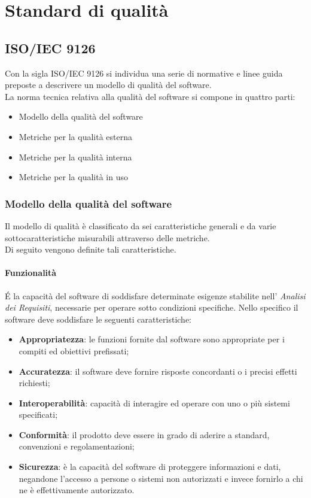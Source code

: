 \section{Standard di qualità}

\subsection{ISO/IEC 9126}
Con la sigla ISO/IEC 9126 si individua una serie di normative e linee guida preposte a descrivere un modello di qualità del software. \\
La norma tecnica relativa alla qualità del software si compone in quattro parti:
\begin{itemize}
	\item Modello della qualità del software
	\item Metriche per la qualità esterna
	\item Metriche per la qualità interna
	\item Metriche per la qualità in uso
\end{itemize}
\subsubsection{Modello della qualità del software}
Il modello di qualità è classificato da sei caratteristiche generali e da varie sottocaratteristiche misurabili attraverso delle metriche.\\
Di seguito vengono definite tali caratteristiche.

\paragraph{Funzionalità}
\'E la capacità del software di soddisfare determinate esigenze stabilite nell' \textit{Analisi dei Requisiti}, necessarie per operare sotto condizioni specifiche. Nello specifico il software deve soddisfare le seguenti caratteristiche:
\begin{itemize}
	\item \textbf{Appropriatezza}: le funzioni fornite dal software sono appropriate per i compiti ed obiettivi prefissati;
	\item \textbf{Accuratezza}: il software deve fornire risposte concordanti o i precisi effetti richiesti;
	\item \textbf{Interoperabilità}: capacità di interagire ed operare con uno o più sistemi specificati;
	\item \textbf{Conformità}: il prodotto deve essere in grado di aderire a standard, convenzioni e regolamentazioni;
	\item \textbf{Sicurezza}: è la capacità del software di proteggere informazioni e dati, negandone l'accesso a persone o sistemi non autorizzati e invece fornirlo a chi ne è effettivamente autorizzato.
\end{itemize}

